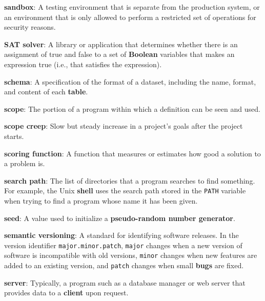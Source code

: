 \documentclass[krantzl]{krantz}
\newcommand{\glosskey}[1]{\textbf{#1}}
\begin{document}
\noindent \textbf{{\newline}\glosskey{sandbox}}: 
A testing environment that is separate from the production system, or an environment that is only allowed to perform a restricted set of operations for security reasons.


\noindent \textbf{{\newline}\glosskey{SAT solver}}: 
A library or application that determines whether there is an assignment of true and false to a set of \glosskey{Boolean} variables that makes an expression true (i.e., that satisfies the expression).


\noindent \textbf{{\newline}\glosskey{schema}}: 
A specification of the format of a dataset, including the name, format, and content of each \glosskey{table}.


\noindent \textbf{{\newline}\glosskey{scope}}: 
The portion of a program within which a definition can be seen and used.


\noindent \textbf{{\newline}\glosskey{scope creep}}: 
Slow but steady increase in a project’s goals after the project starts.


\noindent \textbf{{\newline}\glosskey{scoring function}}: 
A function that measures or estimates how good a solution to a problem is.


\noindent \textbf{{\newline}\glosskey{search path}}: 
The list of directories that a program searches to find something. For example, the Unix \glosskey{shell} uses the search path stored in the \texttt{PATH} variable when trying to find a program whose name it has been given.


\noindent \textbf{{\newline}\glosskey{seed}}: 
A value used to initialize a \glosskey{pseudo-random number generator}.


\noindent \textbf{{\newline}\glosskey{semantic versioning}}: 
A standard for identifying software releases. In the version identifier \texttt{major.minor.patch}, \texttt{major} changes when a new version of software is incompatible with old versions, \texttt{minor} changes when new features are added to an existing version, and \texttt{patch} changes when small \glosskey{bugs} are fixed.


\noindent \textbf{{\newline}\glosskey{server}}: 
Typically, a program such as a database manager or web server that provides data to a \glosskey{client} upon request.
\end{document}
